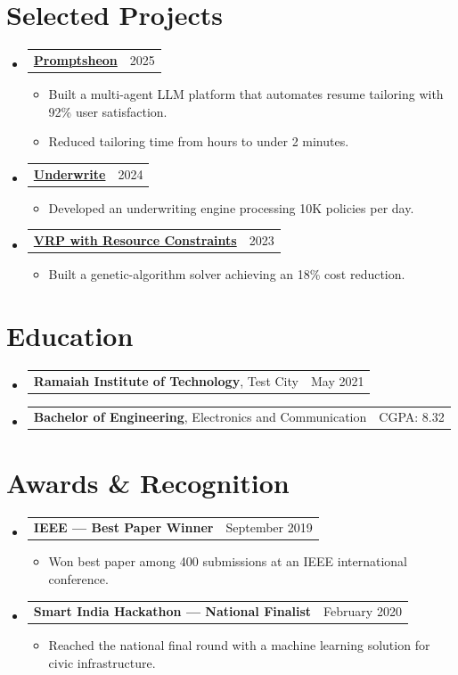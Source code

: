 \documentclass[letterpaper,11pt]{article}
\makeatletter
\newcommand{\resumeItem}[1]{%
  \item\small{#1 \vspace{-1pt}}%
}
\newcommand{\resumeSubheading}[3]{%
  \vspace{2pt}\item
    \begin{tabular*}{\linewidth}[t]{l@{\extracolsep{\fill}}r}
      \textbf{#1}, #2 & #3 \\
    \end{tabular*}\vspace{-4pt}%
}
\newcommand{\resumeProjectHeading}[2]{%
    \vspace{2pt}\item
    \begin{tabular*}{\linewidth}{l@{\extracolsep{\fill}}r}
      \small#1 & #2 \\
    \end{tabular*}\vspace{-4pt}%
}
\newcommand{\resumeSubHeadingListStart}{\begin{itemize}[leftmargin=0.15in, label={}, parsep=0pt, topsep=0pt, itemsep=4pt]}
\newcommand{\resumeSubHeadingListEnd}{\end{itemize}}
\newcommand{\resumeItemListStart}{\begin{itemize}[leftmargin=0.15in, parsep=0pt, topsep=2pt, itemsep=3pt, label=$\bullet$]}
\newcommand{\resumeItemListEnd}{\end{itemize}\vspace{-2pt}}
\makeatother
\begin{document}
\section{Selected Projects}
\resumeSubHeadingListStart
\resumeProjectHeading{\href{https://github.com/gethired/promptsheon}{\textbf{Promptsheon}}}{2025}
\resumeItemListStart
\resumeItem{Built a multi-agent LLM platform that automates resume tailoring with 92\% user satisfaction.}
\resumeItem{Reduced tailoring time from hours to under 2 minutes.}
\resumeItemListEnd
\resumeProjectHeading{\href{https://github.com/gethired/underwrite}{\textbf{Underwrite}}}{2024}
\resumeItemListStart
\resumeItem{Developed an underwriting engine processing 10K policies per day.}
\resumeItemListEnd
\resumeProjectHeading{\href{https://github.com/gethired/vehicle-routing-problem-with-resource-constraints}{\textbf{VRP with Resource Constraints}}}{2023}
\resumeItemListStart
\resumeItem{Built a genetic-algorithm solver achieving an 18\% cost reduction.}
\resumeItemListEnd
\resumeSubHeadingListEnd

\section{Education}
\resumeSubHeadingListStart
\resumeSubheading{Ramaiah Institute of Technology}{Test City}{May 2021}
\vspace{-15pt}
\resumeSubheading{Bachelor of Engineering}{Electronics and Communication}{CGPA: 8.32}
\resumeSubHeadingListEnd

\section{Awards \& Recognition}
\resumeSubHeadingListStart
\resumeProjectHeading{\textbf{IEEE --- Best Paper Winner}}{September 2019}
\resumeItemListStart
\resumeItem{Won best paper among 400 submissions at an IEEE international conference.}
\resumeItemListEnd
\resumeProjectHeading{\textbf{Smart India Hackathon --- National Finalist}}{February 2020}
\resumeItemListStart
\resumeItem{Reached the national final round with a machine learning solution for civic infrastructure.}
\resumeItemListEnd
\resumeSubHeadingListEnd
\end{document}
